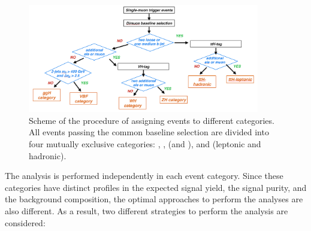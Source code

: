 \begin{figure}[!htb]
    \centering
    \captionsetup{justification=justified}
    \includegraphics[width=0.9\textwidth]{pics/category_scheme.png}
    \caption{Scheme of the procedure of assigning events to different categories. All events passing the common baseline selection
             are divided into four mutually exclusive categories: \ggH, \qqH, \VH (\WH and \ZH), and \ttH (leptonic and hadronic).}
    \label{fig:event_categories}
\end{figure}

The analysis is performed independently in each event category. 
Since these categories have distinct profiles in the expected signal yield, the signal purity, and the background composition, 
the optimal approaches to perform the analyses are also different.
As a result, two different strategies to perform the analysis are considered:

